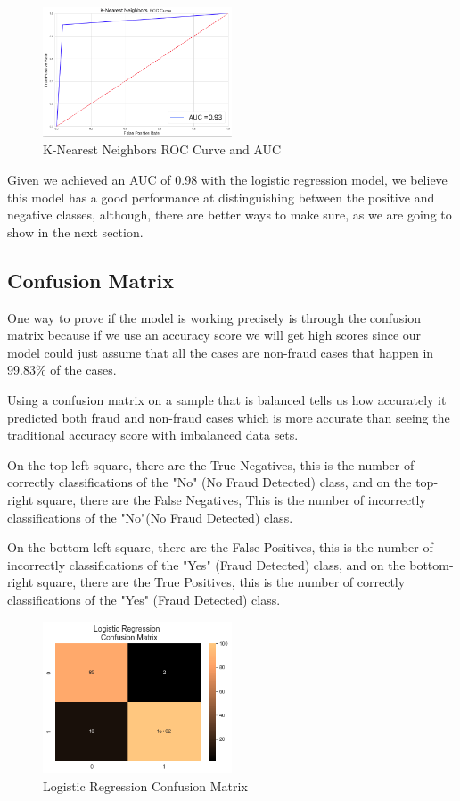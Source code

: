 \documentclass[conference]{IEEEtran}
\begin{document}
\begin{figure}[H]
    \centering\includegraphics[width=0.5\textwidth]{images/roc_auc_kn.png}
    \caption{K-Nearest Neighbors ROC Curve and AUC}
    \label{fig:kn_roc_auc}
\end{figure}

Given we achieved an AUC of 0.98 with the logistic regression model, we believe this model has a good performance at distinguishing between the positive and negative classes, although, there are better ways to make sure, as we are going to show in the next section.

\subsection{Confusion Matrix}

One way to prove if the model is working precisely is through the confusion matrix because if we use an accuracy score we will get high scores since our model could just assume that all the cases are non-fraud cases that happen in 99.83\% of the cases. 

Using a confusion matrix on a sample that is balanced tells us how accurately it predicted both fraud and non-fraud cases which is more accurate than seeing the traditional accuracy score with imbalanced data sets.

On the top left-square, there are the True Negatives, this is the number of correctly classifications of the "No" (No Fraud Detected) class, and on the top-right square, there are the False Negatives, This is the number of incorrectly classifications of the "No"(No Fraud Detected) class.

On the bottom-left square, there are the False Positives, this is the number of incorrectly classifications of the "Yes" (Fraud Detected) class, and on the bottom-right square, there are the True Positives, this is the number of correctly classifications of the "Yes" (Fraud Detected) class.

\begin{figure}[H]
    \centering\includegraphics[width=0.5\textwidth]{images/lr_conf_matrix.png}
    \caption{Logistic Regression Confusion Matrix}
    \label{fig:lr_matrix}
\end{figure}
\end{document}
